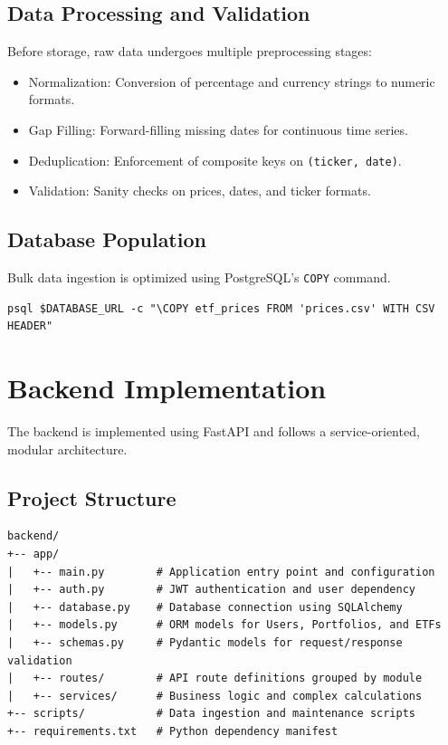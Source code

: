 \subsection{Data Processing and Validation}

Before storage, raw data undergoes multiple preprocessing stages:
\begin{itemize}
    \item {Normalization:} Conversion of percentage and currency strings to numeric formats.
    \item {Gap Filling:} Forward-filling missing dates for continuous time series.
    \item{Deduplication:} Enforcement of composite keys on \texttt{(ticker, date)}.
    \item {Validation:} Sanity checks on prices, dates, and ticker formats.
\end{itemize}

\subsection{Database Population}

Bulk data ingestion is optimized using PostgreSQL’s \texttt{COPY} command.

\begin{lstlisting}[style=bashstyle, caption={Bulk Data Upload Script}]
psql $DATABASE_URL -c "\COPY etf_prices FROM 'prices.csv' WITH CSV HEADER"
\end{lstlisting}

\section{Backend Implementation}

The backend is implemented using FastAPI and follows a service-oriented, modular architecture.

\subsection{Project Structure}

\begin{lstlisting}[caption={Backend Project Structure}]
backend/
+-- app/
|   +-- main.py        # Application entry point and configuration
|   +-- auth.py        # JWT authentication and user dependency
|   +-- database.py    # Database connection using SQLAlchemy
|   +-- models.py      # ORM models for Users, Portfolios, and ETFs
|   +-- schemas.py     # Pydantic models for request/response validation
|   +-- routes/        # API route definitions grouped by module
|   +-- services/      # Business logic and complex calculations
+-- scripts/           # Data ingestion and maintenance scripts
+-- requirements.txt   # Python dependency manifest
\end{lstlisting}

